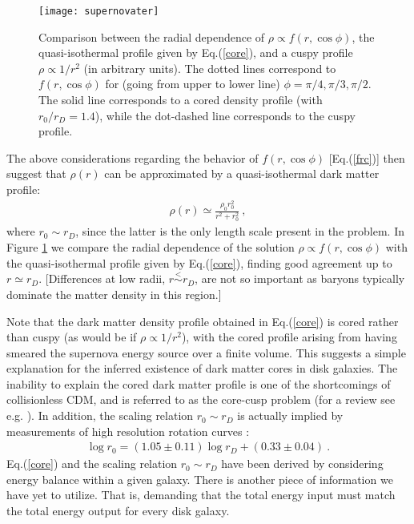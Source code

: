\documentclass[12pt]{article}
\begin{document}
{{\begin{figure}[htpb]
    \vskip 1cm
    \centering
        \texttt{[image: supernovater]}
    \caption{Comparison between the radial dependence of $\rho \propto
f(r,\cos \phi)$, 
the quasi-isothermal profile given by Eq.(\ref{core}), and a cuspy
profile $\rho \propto 1/r ^2$ (in arbitrary units). 
The dotted lines correspond to $f(r,\cos \phi)$ for (going from upper to
lower line) $\phi=\pi/4,\pi/3,\pi/2$. The solid line corresponds to a
cored density profile (with $r _0/r _D = 1.4$), while the dot-dashed
line corresponds to the cuspy profile.}
    \label{fig:Comparison core f}
    \vskip 0.8cm
\end{figure}


The above considerations 
regarding the behavior of $f(r,\cos \phi)$ [Eq.(\ref{frc})] then suggest
that $\rho (r)$ can be approximated by a quasi-isothermal dark matter
profile:
%
\begin{eqnarray}
\rho (r) \simeq \frac{\rho _0r _0 ^2}{r ^2 + r _0 ^2} \ ,
\label{core}
\end{eqnarray}
%
where $r _0 \sim r_D$, since the latter is the only length scale present
in the problem. 
In Figure \ref{fig:Comparison core f} we compare the radial dependence
of the 
solution $\rho \propto f(r,\cos \phi)$ with the quasi-isothermal profile
given by Eq.(\ref{core}), finding 
good agreement up to $r \simeq r _D$. 
[Differences at low radii, $r \stackrel{<}{\sim} r_D$, are not so important as baryons typically
dominate the matter density in this region.]


Note that the dark matter density profile obtained in Eq.(\ref{core}) is
cored rather than 
cuspy (as would be if $\rho \propto 1/r ^2$), with the cored profile
arising from having smeared the supernova energy source 
over a finite volume. This suggests a simple explanation for the
inferred existence of dark matter cores in disk galaxies. The 
inability to explain the cored dark matter profile is one of the
shortcomings of collisionless CDM, and is referred 
to as the core-cusp problem (for a review see e.g. \cite{deblok}). In
addition, the scaling relation $r _0 \sim r_D$ 
is actually implied by measurements of high resolution rotation curves
\cite{donato}:
%
\begin{eqnarray}
\log r _0 = (1.05 \pm 0.11) \log r_D + (0.33 \pm 0.04) \ .
\end{eqnarray}
%
Eq.(\ref{core}) and the scaling relation $r _0 \sim r _D$ have been
derived by considering energy balance within a given galaxy. 
There is another piece of information we have yet to utilize. That is,
demanding that the total energy input must 
match the total energy output for every disk galaxy.



}}
\end{document}
